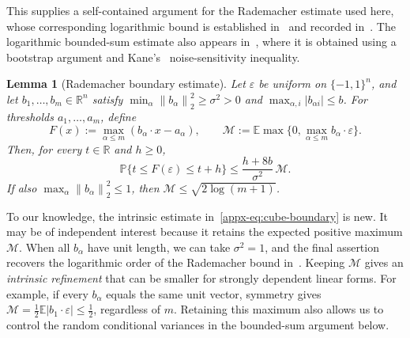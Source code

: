 \documentclass[11pt,letterpaper]{article}
\newtheorem{lemma}{Lemma}
\theoremstyle{remark}
\newcommand{\E}{\mathbb E}
\newcommand{\Pp}{\mathbb P}
\newcommand{\R}{\mathbb R}
\newcommand{\norm}[1]{\left\lVert#1\right\rVert}
\begin{document}
This supplies a self-contained argument for the Rademacher estimate
used here, whose corresponding logarithmic bound is established
in~\cite{OST} and recorded in~\cite[Lemma~J.4]{CCKK2022}.
The logarithmic bounded-sum estimate also appears
in~\cite[Lemma~2.1]{AL}, where it is obtained using a bootstrap
argument and Kane's~\cite{Kane} noise-sensitivity inequality.

\begin{lemma}[Rademacher boundary estimate]\label{appx-lem:cube-boundary}
Let $\varepsilon$ be uniform on $\{-1,1\}^n$, and let
$b_1,\ldots,b_m\in\R^n$ satisfy
$\min_\alpha\norm{b_\alpha}_2^2\ge\sigma^2>0$ and
$\max_{\alpha,i}|b_{\alpha i}|\le b$.
For thresholds $a_1,\ldots,a_m$, define
\[
 F(x):=\max_{\alpha\le m}(b_\alpha\cdot x-a_\alpha),
 \qquad
 \mathcal M:=\E\max\{0,\max_{\alpha\le m}b_\alpha\cdot\varepsilon\}.
\]
Then, for every $t\in\R$ and $h\ge0$,
\begin{equation}
 \Pp\{t\le F(\varepsilon)\le t+h\}
 \le\frac{h+8b}{\sigma^2}\,\mathcal M.
 \label{appx-eq:cube-boundary}
\end{equation}
If also $\max_\alpha\norm{b_\alpha}_2^2\le1$, then
$\mathcal M\le\sqrt{2\log(m+1)}$.
\end{lemma}

To our knowledge, the intrinsic estimate in~\eqref{appx-eq:cube-boundary}
is new. It may be of independent interest because it retains the
expected positive maximum $\mathcal M$.
When all $b_\alpha$ have unit length, we can take $\sigma^2=1$,
and the final assertion recovers the logarithmic order of the
Rademacher bound in~\cite{OST,CCKK2022}. Keeping $\mathcal M$
gives an \emph{intrinsic refinement} that can be smaller for strongly
dependent linear forms. For example, if every $b_\alpha$ equals
the same unit vector, symmetry gives
$\mathcal M=\tfrac12\E|b_1\cdot\varepsilon|\le\tfrac12$,
regardless of $m$. Retaining this maximum also allows us to control
the random conditional variances in the bounded-sum argument below.
\end{document}
